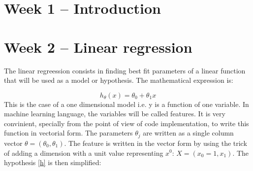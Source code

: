 \documentclass[
10pt, %
a4paper, %
oneside, %
headinclude,footinclude, %
BCOR5mm, %
]{scrartcl}
\begin{document}



\newpage %


\section{Week 1 -- Introduction}



 


\section{Week 2 -- Linear regression}

The linear regreession consists in finding best fit parameters of a linear function that will be used as a model 
or hypothesis. The mathematical expression is:

\begin{equation} \label{h}
    h_{\theta}(x) = \theta_{0} + \theta_{1} x
\end{equation}
This is the case of a one dimensional model i.e. y is a function of one variable. In machine learning language, the variables will be called features.
It is very convinient, specially from the point of view of code implementation, to write this function in vectorial form. 
The parameters $\theta_{j}$ are written as a single column vector $\theta = (\theta_{0}, \theta_{1})$. The feature is written in the vector form by using the trick
of adding a dimension with a unit value representing $x^{0}$: $X = (x_{0}=1, x_{1})$. The hypothesis \ref{h} is then simplified:
\end{document}
